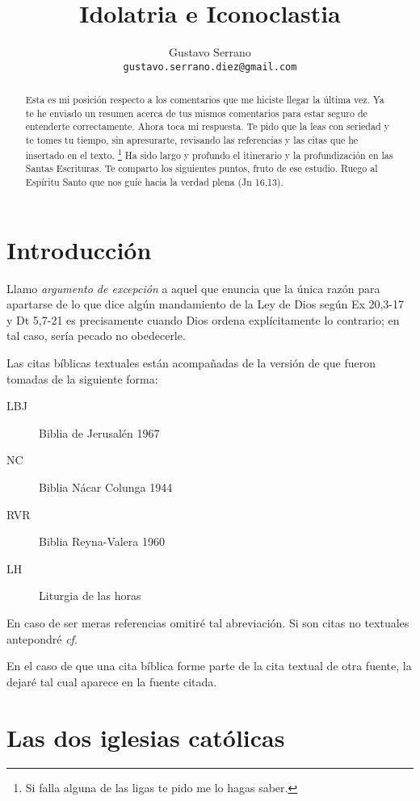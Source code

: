 \documentclass{article}
\title{Idolatria e Iconoclastia}
\author{Gustavo Serrano \\ \tt{gustavo.serrano.diez@gmail.com}}
\begin{document}
\maketitle

\begin{abstract}
\noindent
Esta es mi posici\'on respecto a los comentarios que me hiciste llegar la \'ultima vez. Ya te he enviado un resumen acerca de tus mismos comentarios para estar seguro de entenderte correctamente. Ahora toca mi respuesta. Te pido que la leas con seriedad y te tomes tu tiempo, sin apresurarte, revisando las referencias y las citas que he insertado en el texto.%
    \footnote{Si falla alguna de las ligas te pido me lo hagas saber.}
Ha sido largo y profundo el itinerario y la profundización en las Santas Escrituras. Te comparto los siguientes puntos, fruto de ese estudio. Ruego al Espíritu Santo que nos guíe hacia la verdad plena (Jn 16,13).
\end{abstract}

\tableofcontents

\section{Introducci\'on}

Llamo \emph{argumento de excepci\'on} a aquel que enuncia que la \'unica raz\'on para apartarse de lo que dice alg\'un mandamiento de la Ley de Dios seg\'un Ex 20,3-17 y Dt 5,7-21 es precisamente cuando Dios ordena expl\'{i}citamente lo contrario; en tal caso, ser\'{i}a pecado no obedecerle.

Las citas b\'{i}blicas textuales est\'an acompa\~nadas de la versi\'on de que fueron tomadas de la siguiente forma:

\begin{description}
\item[LBJ] Biblia de Jerusal\'en 1967
\item[NC] Biblia N\'acar Colunga 1944
\item[RVR] Biblia Reyna-Valera 1960
\item[LH] Liturgia de las horas
\end{description}

\noindent
En caso de ser meras referencias omitir\'e tal abreviaci\'on. Si son citas no textuales antepondr\'e \emph{cf}.

En el caso de que una cita b\'{i}blica forme parte de la cita textual de otra fuente, la dejar\'e tal cual aparece en la fuente citada.

\section{Las dos iglesias cat\'olicas}
\end{document}
